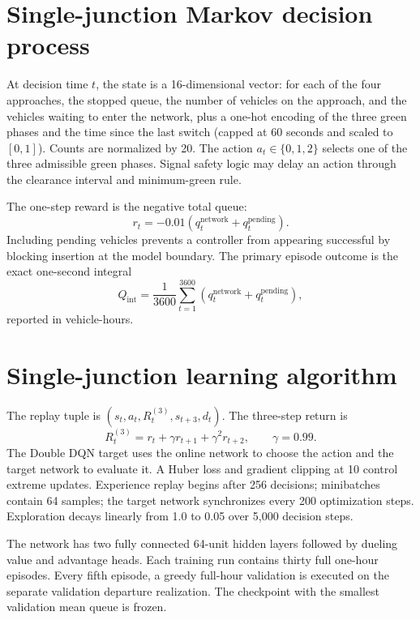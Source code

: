 \documentclass[12pt,a4paper]{report}
\newcommand{\qint}{\ensuremath{Q_{\mathrm{int}}}}
\begin{document}
\section{Single-junction Markov decision process}
At decision time $t$, the state is a 16-dimensional vector: for each of the four approaches, the stopped queue, the number of vehicles on the approach, and the vehicles waiting to enter the network, plus a one-hot encoding of the three green phases and the time since the last switch (capped at 60 seconds and scaled to $[0,1]$). Counts are normalized by 20. The action $a_t\in\{0,1,2\}$ selects one of the three admissible green phases. Signal safety logic may delay an action through the clearance interval and minimum-green rule.

The one-step reward is the negative total queue:
\begin{equation}
r_t=-0.01\left(q_t^{\mathrm{network}}+q_t^{\mathrm{pending}}\right).
\end{equation}
Including pending vehicles prevents a controller from appearing successful by blocking insertion at the model boundary. The primary episode outcome is the exact one-second integral
\begin{equation}
\qint=\frac{1}{3600}\sum_{t=1}^{3600}
\left(q_t^{\mathrm{network}}+q_t^{\mathrm{pending}}\right),
\end{equation}
reported in vehicle-hours.

\section{Single-junction learning algorithm}
The replay tuple is $(s_t,a_t,R_t^{(3)},s_{t+3},d_t)$. The three-step return is
\begin{equation}
R_t^{(3)}=r_t+\gamma r_{t+1}+\gamma^2r_{t+2}, \qquad \gamma=0.99.
\end{equation}
The Double DQN target uses the online network to choose the action and the target network to evaluate it. A Huber loss and gradient clipping at 10 control extreme updates. Experience replay begins after 256 decisions; minibatches contain 64 samples; the target network synchronizes every 200 optimization steps. Exploration decays linearly from 1.0 to 0.05 over 5,000 decision steps.

The network has two fully connected 64-unit hidden layers followed by dueling value and advantage heads. Each training run contains thirty full one-hour episodes. Every fifth episode, a greedy full-hour validation is executed on the separate validation departure realization. The checkpoint with the smallest validation mean queue is frozen.
\end{document}
